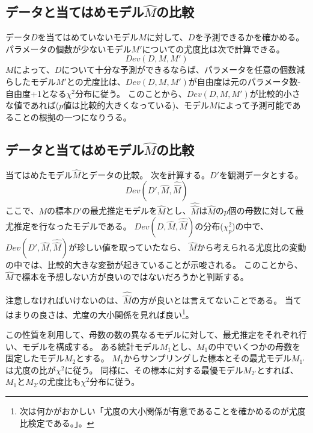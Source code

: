\subsection{データと当てはめモデル$\hat{M}$の比較}
データ$D$を当てはめていないモデル$M$に対して、$D$を予測できるかを確かめる。
パラメータの個数が少ないモデル$M'$についての尤度比は次で計算できる。
\begin{equation*}
    Dev(D,M,M')
\end{equation*}
$M$によって、$D$について十分な予測ができるならば、パラメータを任意の個数減らしたモデル$M'$との尤度比は、$Dev(D,M,M')$が自由度は元のパラメータ数-自由度+1となる$\chi^2$分布に従う。
このことから、$Dev(D,M,M')$が比較的小さな値であれば($p$値は比較的大きくなっている)、モデル$M$によって予測可能であることの根拠の一つになりうる。


\subsection{データと当てはめモデル$\hat{M}$の比較}
当てはめたモデル$\hat{M}$とデータの比較。
次を計算する。$D'$を観測データとする。
\begin{equation*}
    Dev(D',\hat{M},\hat{\hat{M}}) 
\end{equation*}
ここで、$M$の標本$D'$の最尤推定モデルを$\hat{M}$とし、$\hat{\hat{M}}$は$\hat{M}$の$p$個の母数に対して最尤推定を行なったモデルである。
$Dev(D,\hat{M},\hat{\hat{M}}) $の分布($\chi^2_p$)の中で、$Dev(D',\hat{M},\hat{\hat{M}}) $が珍しい値を取っていたなら、
$\hat{M}$から考えられる尤度比の変動の中では、比較的大きな変動が起きていることが示唆される。
このことから、$\hat{M}$で標本を予想しない方が良いのではないだろうかと判断する。

注意しなければいけないのは、$\hat{\hat{M}}$の方が良いとは言えてないことである。
当てはまりの良さは、尤度の大小関係を見れば良い\footnote{次は何かがおかしい「尤度の大小関係が有意であることを確かめるのが尤度比検定である。」。}。%

この性質を利用して、母数の数の異なるモデルに対して、最尤推定をそれぞれ行い、モデルを構成する。
ある統計モデル$M_1$とし、$M_1$の中でいくつかの母数を固定したモデル$M_2$とする。
$M_1$からサンプリングした標本とその最尤モデル$M_{1'}$は尤度の比が$\chi^2$に従う。
同様に、その標本に対する最優モデル$M_{2'}$とすれば、$M_1$と$M_{2'}$の尤度比も$\chi^2$分布に従う。

